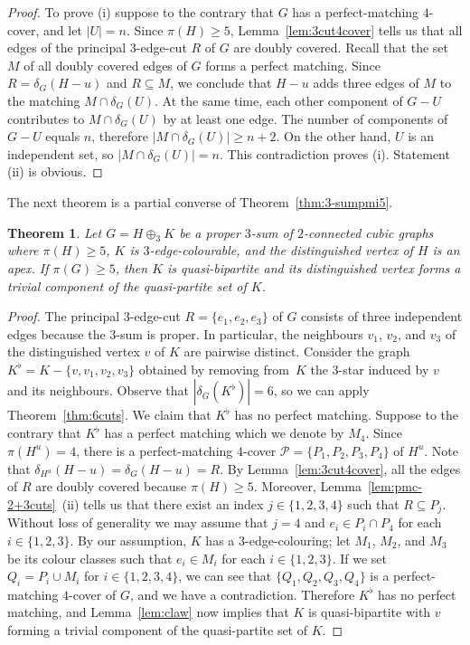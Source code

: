 \documentclass[a4paper]{amsart}
\theoremstyle{plain}
\newtheorem{theorem}{Theorem}[section]
\theoremstyle{definition}
\begin{document}
\begin{proof}
To prove (i) suppose to the contrary that $G$ has a
perfect-matching $4$-cover, and let $|U|=n$. Since $\pi(H)\geq
5$, Lemma~\ref{lem:3cut4cover} tells us that all edges of the
principal $3$-edge-cut $R$ of $G$ are doubly covered. Recall
that the set $M$ of all doubly covered edges of $G$ forms a
perfect matching. Since $R=\delta_G(H-u)$ and $R\subseteq M$,
we conclude that $H-u$ adds three edges of $M$ to the matching
$M\cap\delta_G(U)$. At the same time, each other component of
$G-U$ contributes to $M\cap\delta_G(U)$ by at least one edge.
The number of components of $G-U$ equals $n$, therefore
$|M\cap\delta_G(U)|\ge n+2$. On the other hand, $U$ is an
independent set, so $|M\cap\delta_G(U)|=n$. This contradiction
proves (i). Statement (ii) is obvious.
\end{proof}

The next theorem is a partial converse of
Theorem~\ref{thm:3-sumpmi5}.

\begin{theorem}\label{thm:3-sumpmi5-converse}
Let $G=H\oplus_3 K$ be a proper $3$-sum of $2$-connected cubic
graphs where $\pi(H)\ge 5$, $K$ is $3$-edge-colourable, and the
distinguished vertex of $H$ is an apex. If $\pi(G)\ge 5$, then
$K$ is quasi-bipartite and its distinguished vertex forms a
trivial component of the quasi-partite set of $K$.
\end{theorem}

\begin{proof}
The principal $3$-edge-cut $R=\{e_1,e_2,e_3\}$ of $G$ consists
of three independent edges because the $3$-sum is proper. In
particular, the neighbours $v_1$, $v_2$, and $v_3$ of the
distinguished vertex $v$ of $K$ are pairwise distinct. Consider
the graph $K^{\flat}=K-\{v,v_1,v_2,v_3\}$ obtained by removing
from~$K$ the $3$-star induced by $v$ and its neighbours.
Observe that $|\delta_G(K^{\flat})|=6$, so we can apply
Theorem~\ref{thm:6cuts}. We claim that $K^{\flat}$ has no
perfect matching. Suppose to the contrary that $K^{\flat}$ has
a perfect matching which we denote by $M_4$. Since
$\pi(H^u)=4$, there is a perfect-matching $4$-cover
$\mathcal{P}=\{P_1,P_2,P_3,P_4\}$ of $H^u$. Note that
$\delta_{H^u}(H-u)=\delta_G(H-u)=R$. By
Lemma~\ref{lem:3cut4cover}, all the edges of $R$ are doubly
covered because $\pi(H)\ge 5$. Moreover,
Lemma~\ref{lem:pmc-2+3cuts}~(ii) tells us that there exist an
index $j\in\{1,2,3,4\}$ such that $R\subseteq P_j$. Without
loss of generality we may assume that $j=4$ and $e_i\in P_i\cap
P_4$ for each $i\in\{1,2,3\}$. By our assumption, $K$ has a
$3$-edge-colouring; let $M_1$, $M_2$, and $M_3$ be its colour
classes such that $e_i\in M_i$ for each $i\in\{1,2,3\}$. If we
set $Q_i=P_i\cup M_i$ for $i\in\{1,2,3,4\}$, we can see that
$\{Q_1,Q_2,Q_3,Q_4\}$ is a perfect-matching $4$-cover of $G$,
and we have a contradiction. Therefore $K^{\flat}$ has no
perfect matching, and Lemma~\ref{lem:claw} now implies that $K$
is quasi-bipartite with $v$ forming a trivial component of the
quasi-partite set of $K$.
\end{proof}
\end{document}

